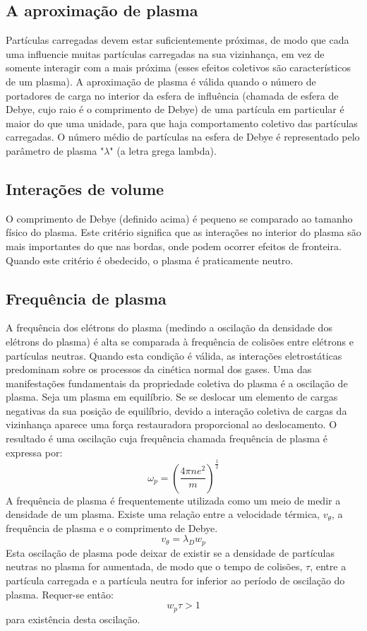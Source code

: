 \documentclass[12pt,oneside,a4paper]{abntex2}
\theoremstyle{definition}  %
\begin{document}
\subsection{A aproximação de plasma} 	 
   Partículas carregadas devem estar suficientemente próximas, de modo que cada uma influencie muitas partículas carregadas na sua vizinhança, em vez de somente interagir com a mais próxima (esses efeitos coletivos são característicos de um plasma). A aproximação de plasma é válida quando o número de portadores de carga no interior da esfera de influência (chamada de esfera de Debye, cujo raio é o comprimento de Debye) de uma partícula em particular é maior do que uma unidade, para que haja comportamento coletivo das partículas carregadas. O número médio de partículas na esfera de Debye é representado pelo parâmetro de plasma "$\lambda$" (a letra grega lambda).
\subsection{Interações de volume} 
   O comprimento de Debye (definido acima) é pequeno se comparado ao tamanho físico do plasma. Este critério significa que as interações no interior do plasma são mais importantes do que nas bordas, onde podem ocorrer efeitos de fronteira. Quando este critério é obedecido, o plasma é praticamente neutro.
\subsection{Frequência de plasma} 
    A frequência dos elétrons do plasma (medindo a oscilação da densidade dos elétrons do plasma) é alta se comparada à frequência de colisões entre elétrons e partículas neutras. Quando esta condição é válida, as interações eletrostáticas predominam sobre os processos da cinética normal dos gases.
    Uma das manifestações fundamentais da propriedade coletiva do plasma é a oscilação de plasma. Seja um plasma em equilíbrio. Se se deslocar um elemento de cargas negativas da sua posição de equilíbrio, devido a interação coletiva de cargas da vizinhança aparece uma força restauradora proporcional ao deslocamento. O resultado é uma oscilação cuja frequência chamada frequência de plasma é expressa por:
\begin{equation}
    \omega_p = (\frac{4\pi n e^2}{m})^{\frac{1}{2}}
\end{equation}
A frequência de plasma é frequentemente utilizada como um meio de medir a densidade de um plasma. Existe uma relação entre a velocidade térmica, $v_\theta$, a frequência de plasma e o comprimento de Debye.
\begin{equation}
v_\theta = \lambda_D w_p
\end{equation}
Esta oscilação de plasma pode deixar de existir se a densidade de partículas neutras no plasma for aumentada, de modo que o tempo de colisões, $\tau$, entre a partícula carregada e a partícula neutra for inferior ao período de oscilação do plasma. Requer-se então:
\begin{equation}
 w_p\tau > 1 
 \end{equation} 
para existência desta oscilação.
\end{document}

